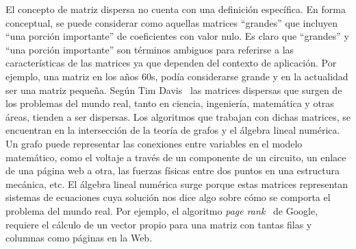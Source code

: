 El concepto de matriz dispersa no cuenta con una definición específica. En forma conceptual, se puede considerar como aquellas matrices ``grandes'' que incluyen ``una porción importante'' de coeficientes con valor nulo. Es claro que ``grandes'' y ``una porción importante'' son términos ambiguos para referirse a las características de las matrices ya que dependen del contexto de aplicación. Por ejemplo, una matriz en los años 60s, podía considerarse grande y en la actualidad ser una matriz pequeña. 
Según Tim Davis~\cite{TimDavis} las matrices dispersas que surgen de los problemas del mundo real, tanto en ciencia, ingeniería, matemática y otras áreas, tienden a ser dispersas. Los algoritmos que trabajan con dichas matrices, se encuentran en la intersección de la teoría de grafos y el álgebra lineal numérica. Un grafo puede representar las conexiones entre variables en el modelo matemático, como el voltaje a través de un componente de un circuito, un enlace de una página web a otra, las fuerzas físicas entre dos puntos en una estructura mecánica, etc. El álgebra lineal numérica surge porque estas matrices representan sistemas de ecuaciones cuya solución nos dice algo sobre cómo se comporta el problema del mundo real. Por ejemplo, el algoritmo \textit{page rank}~\cite{pagerank} de Google, requiere el cálculo de un vector propio para una matriz con tantas filas y columnas como páginas en la Web. %



